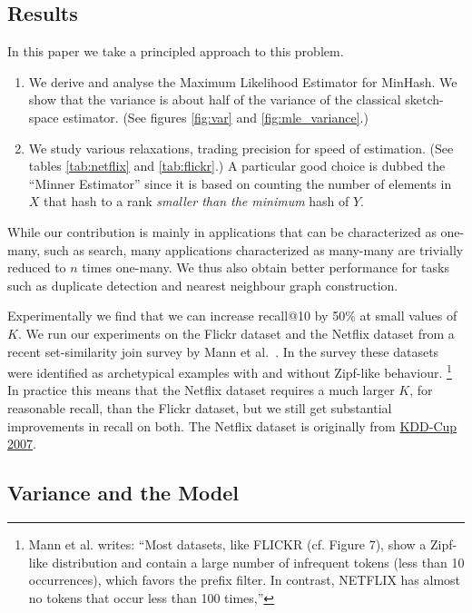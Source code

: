 \subsection{Results}

In this paper we take a principled approach to this problem.
\begin{enumerate}
   \item We derive and analyse the Maximum Likelihood Estimator for MinHash.
      We show that the variance is about half of the variance of the classical sketch-space estimator. (See figures \ref{fig:var} and \ref{fig:mle_variance}.)
   \item We study various relaxations, trading precision for speed of estimation. (See tables \ref{tab:netflix} and \ref{tab:flickr}.)
      A particular good choice is dubbed the ``Minner Estimator'' since it is based on counting the number of elements in $X$ that hash to a rank \emph{smaller than the minimum} hash of $Y$.
\end{enumerate}

While our contribution is mainly in applications that can be characterized as one-many, such as search, many applications characterized as many-many are trivially reduced to $n$ times one-many.
We thus also obtain better performance for tasks such as duplicate detection and nearest neighbour graph construction.

Experimentally we find that we can increase recall@10 by 50\% at small values of $K$.
We run our experiments on the Flickr dataset and the Netflix dataset from a recent set-similarity join survey by Mann et al.~\cite{mann2016empirical}.
In the survey these datasets were identified as archetypical examples with and without Zipf-like behaviour.
\footnote{Mann et al. writes:
 ``Most datasets, like FLICKR (cf. Figure 7), show a Zipf-like
 distribution and contain a large number of infrequent tokens (less
 than 10 occurrences), which favors the prefix filter. In contrast,
 NETFLIX has almost no tokens that occur less than 100 times,''
 }
In practice this means that the Netflix dataset requires a much larger $K$, for reasonable recall, than the Flickr dataset, but we still get substantial improvements in recall on both.
The Netflix dataset is originally from \href{https://www.cs.uic.edu/~liub/Netflix-KDD-Cup-2007.html}{KDD-Cup 2007}.

\subsection{Variance and the Model}

